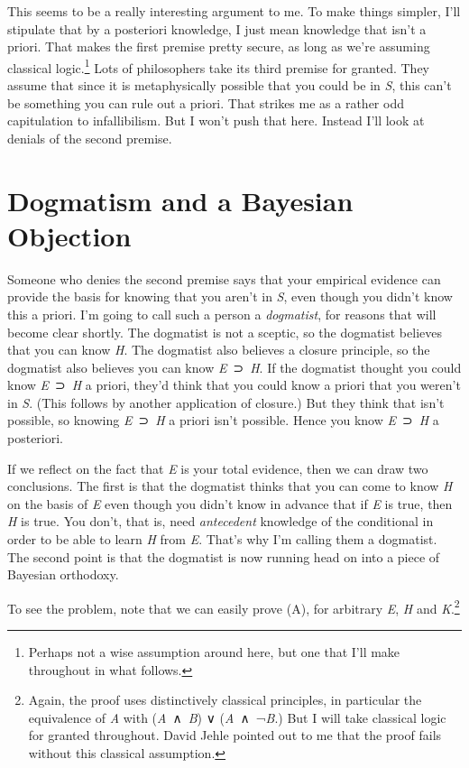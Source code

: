 \documentclass[
  10pt,
  letterpaper,
  DIV=11,
  numbers=noendperiod,
  twoside]{scrartcl}
\begin{document}
This seems to be a really interesting argument to me. To make things
simpler, I'll stipulate that by a posteriori knowledge, I just mean
knowledge that isn't a priori. That makes the first premise pretty
secure, as long as we're assuming classical logic.\footnote{Perhaps not
  a wise assumption around here, but one that I'll make throughout in
  what follows.} Lots of philosophers take its third premise for
granted. They assume that since it is metaphysically possible that you
could be in \emph{S}, this can't be something you can rule out a priori.
That strikes me as a rather odd capitulation to infallibilism. But I
won't push that here. Instead I'll look at denials of the second
premise.

\section{Dogmatism and a Bayesian
Objection}\label{dogmatism-and-a-bayesian-objection}

Someone who denies the second premise says that your empirical evidence
can provide the basis for knowing that you aren't in \emph{S}, even
though you didn't know this a priori. I'm going to call such a person a
\emph{dogmatist}, for reasons that will become clear shortly. The
dogmatist is not a sceptic, so the dogmatist believes that you can know
\emph{H}. The dogmatist also believes a closure principle, so the
dogmatist also believes you can know \emph{E}~⊃~\emph{H}. If the
dogmatist thought you could know \emph{E}~⊃~\emph{H} a priori, they'd
think that you could know a priori that you weren't in \emph{S}. (This
follows by another application of closure.) But they think that isn't
possible, so knowing \emph{E}~⊃~\emph{H} a priori isn't possible. Hence
you know \emph{E}~⊃~\emph{H} a posteriori.

If we reflect on the fact that \emph{E} is your total evidence, then we
can draw two conclusions. The first is that the dogmatist thinks that
you can come to know \emph{H} on the basis of \emph{E} even though you
didn't know in advance that if \emph{E} is true, then \emph{H} is true.
You don't, that is, need \emph{antecedent} knowledge of the conditional
in order to be able to learn \emph{H} from \emph{E}. That's why I'm
calling them a dogmatist. The second point is that the dogmatist is now
running head on into a piece of Bayesian orthodoxy.

To see the problem, note that we can easily prove (A), for arbitrary
\emph{E}, \emph{H} and \emph{K}.\footnote{Again, the proof uses
  distinctively classical principles, in particular the equivalence of
  \emph{A} with (\emph{A}~∧~\emph{B}) ∨ (\emph{A}~∧~¬\emph{B}.) But I
  will take classical logic for granted throughout. David Jehle pointed
  out to me that the proof fails without this classical assumption.}
\end{document}
